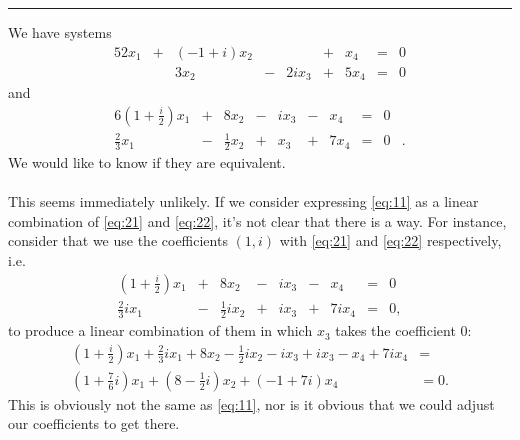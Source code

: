 \documentclass[12pt]{article}
\begin{document}
\begin{enumerate}
      \noindent\rule{\textwidth}{1pt}

      We have systems
      \begin{alignat}{5}
        2x_1 & {}+{} & (-1 + i)x_2 & {} {} &       & {}+{} &  x_4 & {}={} & 0 \label{eq:11}\\
             & {} {} &        3x_2 & {}-{} & 2ix_3 & {}+{} & 5x_4 & {}={} & 0 \label{eq:12}
      \end{alignat}
      and
      \begin{alignat}{6}
        (1 + \frac{i}{2})x_1 & {}+{} &           8x_2 & {}-{} & ix_3 & {}-{} &  x_4 & {}={} & 0 & \label{eq:21} \\
              \frac{2}{3}x_1 & {}-{} & \frac{1}{2}x_2 & {}+{} & x_3 & {}+{} & 7x_4 & {}={}  & 0 &.\label{eq:22}
      \end{alignat}
      We would like to know if they are equivalent.\\\\
      This seems immediately unlikely. If we consider expressing
      \eqref{eq:11} as a linear combination of \eqref{eq:21} and
      \eqref{eq:22}, it's not clear that there is a way. For instance,
      consider that we use the coefficients $(1,i)$ with
      \eqref{eq:21} and \eqref{eq:22} respectively, i.e.
      \[
      \begin{array}{rcrcrcrcl}
        (1 + \frac{i}{2})x_1 & + & 8x_2 & - & ix_3 & - & x_4 & = & 0\\
        \frac{2}{3}ix_1 & - & \frac{1}{2}ix_2 & + & ix_3 & + & 7ix_4 & = & 0,
      \end{array}
      \]
      to produce a linear combination of them in which $x_3$ takes
      the coefficient $0$:
      \begin{align*}
        (1 + \frac{i}{2})x_1 + \frac{2}{3}ix_1 + 8x_2 - \frac{1}{2}ix_2 - ix_3 + ix_3 - x_4 + 7ix_4 &=\\
        (1 + \frac{7}{6}i)x_1 + (8 - \frac{1}{2}i)x_2 + (-1 + 7i)x_4 &= 0.
      \end{align*}
      This is obviously not the same as \eqref{eq:11}, nor is it
      obvious that we could adjust our coefficients to get there.


\end{enumerate}
\end{document}
